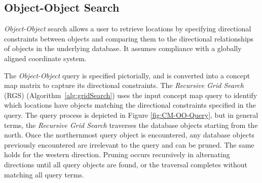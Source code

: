 \subsection{Object-Object Search}

\textit{Object-Object} search allows a user to retrieve locations by specifying directional constraints between objects and comparing them to the directional relationships of objects in the underlying database. 
It assumes compliance with a globally aligned coordinate system.

The \textit{Object-Object} query is specified pictorially, and is converted into a concept map matrix to capture its directional constraints.
The \textit{Recursive Grid Search} (RGS) (Algorithm~\ref{alg:gridSearch}) uses the input concept map query to identify which locations have objects matching the directional constraints specified in the query. 
The query process is depicted in Figure \ref{fig:CM-OO-Query}, but in general terms, the \textit{Recursive Grid Search} traverses the database objects starting from the north.
Once the northernmost query object is encountered, any database objects previously encountered are irrelevant to the query and can be pruned.
The same holds for the western direction.
Pruning occurs recursively in alternating directions until all query objects are found, or the traversal completes without matching all query terms.






